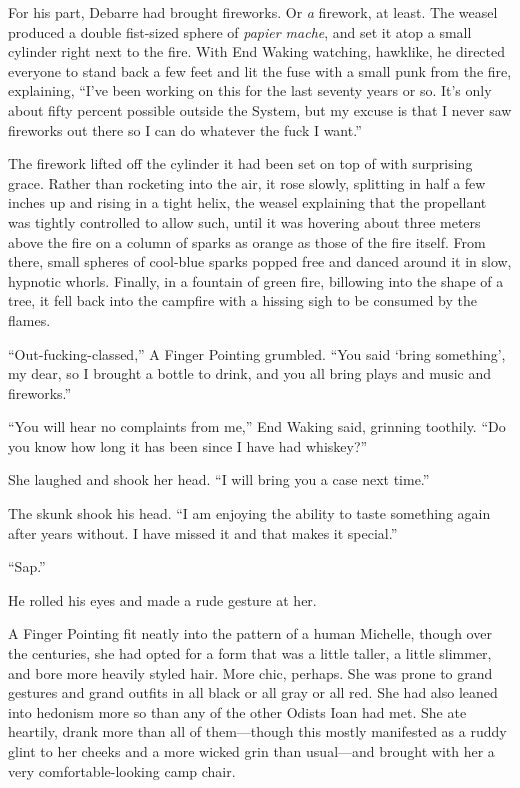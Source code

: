 For his part, Debarre had brought fireworks. Or \emph{a} firework, at least. The weasel produced a double fist-sized sphere of \emph{papier mache}, and set it atop a small cylinder right next to the fire. With End Waking watching, hawklike, he directed everyone to stand back a few feet and lit the fuse with a small punk from the fire, explaining, ``I've been working on this for the last seventy years or so. It's only about fifty percent possible outside the System, but my excuse is that I never saw fireworks out there so I can do whatever the fuck I want.''

The firework lifted off the cylinder it had been set on top of with surprising grace. Rather than rocketing into the air, it rose slowly, splitting in half a few inches up and rising in a tight helix, the weasel explaining that the propellant was tightly controlled to allow such, until it was hovering about three meters above the fire on a column of sparks as orange as those of the fire itself. From there, small spheres of cool-blue sparks popped free and danced around it in slow, hypnotic whorls. Finally, in a fountain of green fire, billowing into the shape of a tree, it fell back into the campfire with a hissing sigh to be consumed by the flames.

``Out-fucking-classed,'' A Finger Pointing grumbled. ``You said `bring something', my dear, so I brought a bottle to drink, and you all bring plays and music and fireworks.''

``You will hear no complaints from me,'' End Waking said, grinning toothily. ``Do you know how long it has been since I have had whiskey?''

She laughed and shook her head. ``I will bring you a case next time.''

The skunk shook his head. ``I am enjoying the ability to taste something again after years without. I have missed it and that makes it special.''

``Sap.''

He rolled his eyes and made a rude gesture at her.

A Finger Pointing fit neatly into the pattern of a human Michelle, though over the centuries, she had opted for a form that was a little taller, a little slimmer, and bore more heavily styled hair. More chic, perhaps. She was prone to grand gestures and grand outfits in all black or all gray or all red. She had also leaned into hedonism more so than any of the other Odists Ioan had met. She ate heartily, drank more than all of them—though this mostly manifested as a ruddy glint to her cheeks and a more wicked grin than usual—and brought with her a very comfortable-looking camp chair.

